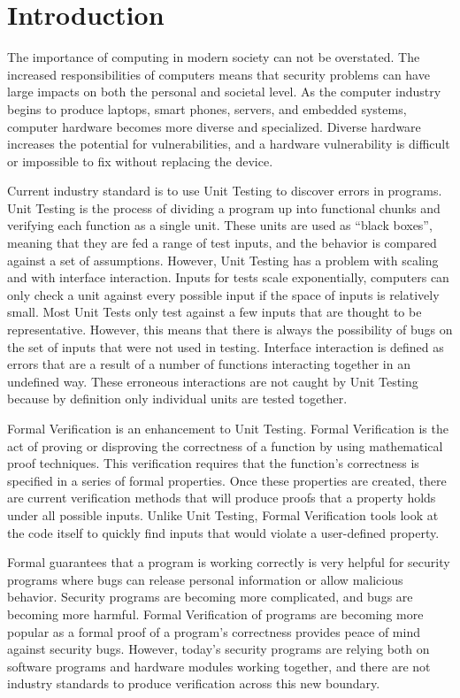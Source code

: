 \documentclass[../report.tex]{subfiles}
\begin{document}
\onehalfspacing

\section{Introduction}

The importance of computing in modern society can not be overstated. The
increased responsibilities of computers means that security problems can have
large impacts on both the personal and societal level.  As the computer industry
begins to produce laptops, smart phones, servers, and embedded systems, computer
hardware becomes more diverse and specialized. Diverse hardware increases the
potential for vulnerabilities, and a hardware vulnerability is difficult or
impossible to fix without replacing the device. 

Current industry standard is to use Unit Testing to discover errors in programs. 
Unit Testing is the process of dividing a program up into functional chunks and
verifying each function as a single unit. 
These units are used as ``black boxes'', meaning that they are fed a range
of test inputs, and the behavior is compared against a set of assumptions.
However, Unit Testing has a problem with scaling and with interface interaction.
Inputs for tests scale exponentially, computers can only check a unit against
every possible input if the space of inputs is relatively small. 
Most Unit Tests only test against a few inputs that are thought to be
representative. 
However, this means that there is always the possibility of bugs
on the set of inputs that were not used in testing.
Interface interaction is defined as errors that are a result of a number of
functions interacting together in an undefined way.
These erroneous interactions are not caught by Unit Testing because by
definition only individual units are tested together. 

Formal Verification is an enhancement to Unit Testing. 
Formal Verification is the act of proving or disproving the correctness of a
function by using mathematical proof techniques. 
This verification requires that the function's correctness is specified in a
series of formal properties.
Once these properties are created, there are current verification methods that
will produce proofs that a property holds under all possible inputs.
Unlike Unit Testing, Formal Verification tools look at the code itself to quickly find inputs that would violate a user-defined property. 

Formal guarantees that a program is working correctly is very helpful for
security programs where bugs can release personal information or allow malicious
behavior.
Security programs are becoming more complicated, and bugs are becoming more
harmful.
Formal Verification of programs are becoming more popular as a formal proof of
a program's correctness provides peace of mind against security bugs.
However, today's security programs are relying both on software programs and
hardware modules working together, and there are not industry standards to
produce verification across this new boundary.
\end{document}
